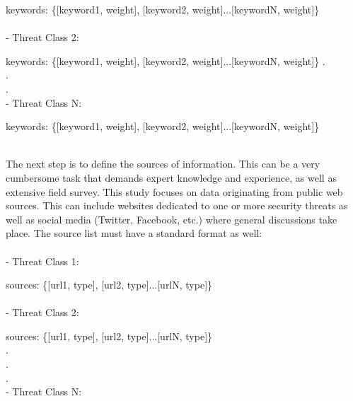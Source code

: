 \documentclass[12pt]{article}
\begin{document}
keywords: \{[keyword1, weight], [keyword2, weight]...[keywordN, weight]\}\\\\
- Threat Class 2:

keywords: \{[keyword1, weight], [keyword2, weight]...[keywordN, weight]\}
.\\
.\\
.\\
- Threat Class N:

keywords: \{[keyword1, weight], [keyword2, weight]...[keywordN, weight]\}
 
\hfill \break \\
The next step is to define the sources of information. This can be a very cumbersome task that demands expert knowledge and experience, as well as extensive field survey. This study focuses on data originating from public web sources. This can include websites dedicated to one or more security threats as well as social media (Twitter, Facebook, etc.) where general discussions take place. The source list must have a standard format as well:\\\\
- Threat Class 1:

sources: \{[url1, type], [url2, type]...[urlN, type]\}\\\\
- Threat Class 2:

sources: \{[url1, type], [url2, type]...[urlN, type]\}\\
.\\
.\\
.\\
- Threat Class N:
\end{document}
